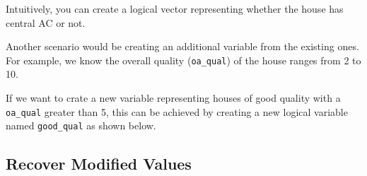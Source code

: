 \documentclass[
]{book}
\newenvironment{Shaded}{\begin{snugshade}}{\end{snugshade}}
\newcommand{\CommentTok}[1]{\textcolor[rgb]{0.56,0.35,0.01}{\textit{#1}}}
\newcommand{\DecValTok}[1]{\textcolor[rgb]{0.00,0.00,0.81}{#1}}
\newcommand{\FunctionTok}[1]{\textcolor[rgb]{0.00,0.00,0.00}{#1}}
\newcommand{\NormalTok}[1]{#1}
\newcommand{\OtherTok}[1]{\textcolor[rgb]{0.56,0.35,0.01}{#1}}
\newcommand{\SpecialCharTok}[1]{\textcolor[rgb]{0.00,0.00,0.00}{#1}}
\newcommand{\StringTok}[1]{\textcolor[rgb]{0.31,0.60,0.02}{#1}}
\begin{document}
Intuitively, you can create a logical vector representing whether the house has central AC or not.

\begin{Shaded}
\end{Shaded}

Another scenario would be creating an additional variable from the existing ones. For example, we know the overall quality (\texttt{oa\_qual}) of the house ranges from 2 to 10.

\begin{Shaded}
\end{Shaded}

If we want to crate a new variable representing houses of good quality with a \texttt{oa\_qual} greater than 5, this can be achieved by creating a new logical variable named \texttt{good\_qual} as shown below.

\begin{Shaded}
\end{Shaded}

\hypertarget{recover-modified-values}{%
\subsection{Recover Modified Values}\label{recover-modified-values}}
\end{document}
